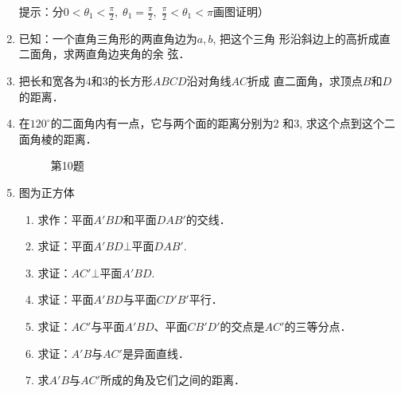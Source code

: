 \begin{enumerate}
提示：分$0<\theta_1<\frac{\pi}{2},\; \theta_1=\frac{\pi}{2},\; \frac{\pi}{2}<\theta_1<\pi$画图证明）
\item 已知：一个直角三角形的两直角边为$a,b$, 把这个三角
形沿斜边上的高折成直二面角，求两直角边夹角的余
弦．
\item 把长和宽各为4和3的长方形$ABCD$沿对角线$AC$折成
直二面角，求顶点$B$和$D$的距离．
\item 在$120^{\circ}$的二面角内有一点，它与两个面的距离分别为2
和3, 求这个点到这个二面角棱的距离．

\begin{figure}[htp]\centering
{}
  \caption*{第10题}
  \end{figure}

\item 图为正方体
\begin{enumerate}
\item 求作：平面$A'BD$和平面$DAB'$的交线．
\item 求证：平面$A'BD\bot $平面$DAB'$.
\item 求证：$AC'\bot$平面$A'BD$.
\item 求证：平面$A'BD$与平面$CD'B'$平行．
\item 求证：$AC'$与平面$A'BD$、平面$CB'D'$的交点是$AC'$的三等分点．
\item 求证：$A'B$与$AC'$是异面直线．
\item 求$A'B$与$AC'$所成的角及它们之间的距离．
\end{enumerate}


\end{enumerate}
